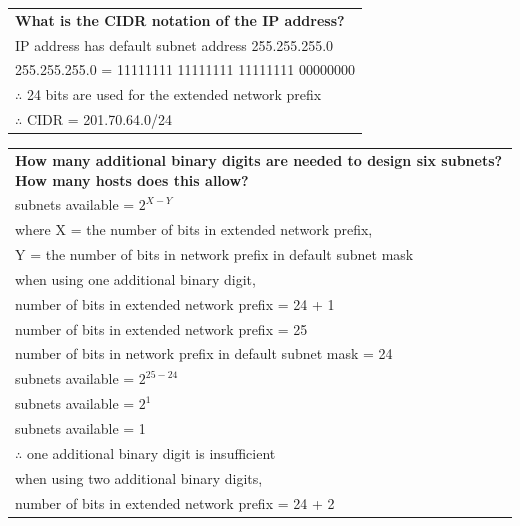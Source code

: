 \documentclass[a4paper]{systems-software}
\begin{document}
\begin{longtabu} to \textwidth {| X[1,l] |}
	\hline
	\textbf{What is the CIDR notation of the IP address?} \\
	\vspace{2.5mm}
	IP address has default subnet address 255.255.255.0 \\
	255.255.255.0 = 11111111 11111111 11111111 00000000 \\
	$\therefore$ 24 bits are used for the extended network prefix \\
	$\therefore$ CIDR = 201.70.64.0/24 \\
	\hline
\end{longtabu}

\newpage

\begin{longtabu} to \textwidth {| X[1,l] |}
	\hline
	\textbf{How many additional binary digits are needed to design six subnets? How many hosts does this allow?} \\
	\vspace{2.5mm}
	subnets available = $2^{X - Y}$ \\
	where X = the number of bits in extended network prefix, \\
	Y = the number of bits in network prefix in default subnet mask \\
	\vspace{2.5mm}
	when using one additional binary digit, \\
	\hspace{5mm} number of bits in extended network prefix = 24 + 1\\
	\hspace{5mm} number of bits in extended network prefix = 25\\
	\hspace{5mm} number of bits in network prefix in default subnet mask = 24 \\
	\hspace{5mm} subnets available = $2^{25 - 24}$ \\
	\hspace{5mm} subnets available = $2^{1}$ \\
	\hspace{5mm} subnets available = 1 \\
	$\therefore$ one additional binary digit is insufficient \\
	\vspace{2.5mm}
	when using two additional binary digits, \\
	\hspace{5mm} number of bits in extended network prefix = 24 + 2\\

\end{longtabu}
\end{document}
